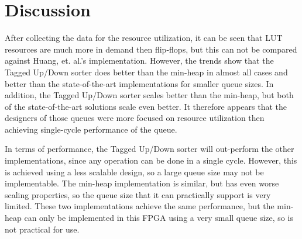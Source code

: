 \section{Discussion}
\label{sec:discussion}

After collecting the data for the resource utilization, it can be seen that LUT resources are much more in demand then flip-flops, but this can not be compared against Huang, et. al.'s implementation. However, the trends show that the Tagged Up/Down sorter does better than the min-heap in almost all cases and better than the state-of-the-art implementations for smaller queue sizes. In addition, the Tagged Up/Down sorter scales better than the min-heap, but both of the state-of-the-art solutions scale even better. It therefore appears that the designers of those queues were more focused on resource utilization then achieving single-cycle performance of the queue.

In terms of performance, the Tagged Up/Down sorter will out-perform the other implementations, since any operation can be done in a single cycle. However, this is achieved using a less scalable design, so a large queue size may not be implementable. The min-heap implementation is similar, but has even worse scaling properties, so the queue size that it can practically support is very limited. These two implementations achieve the same performance, but the min-heap can only be implemented in this FPGA using a very small queue size, so is not practical for use.